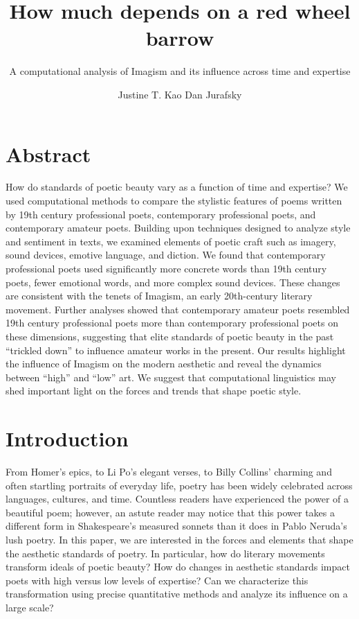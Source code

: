\documentclass{book}
\title       {How much depends on a red wheel barrow}
\subtitle    {A computational analysis of Imagism and its influence across time and expertise}
\author      {Justine T. Kao\affiliation{Department of Psychology, Stanford University} {Dan Jurafsky\affiliation{Department of Linguistics, Stanford University}}}
\begin{document}
\section*{Abstract}
How do standards of poetic beauty vary as a function of time and expertise? We used computational methods to compare the stylistic features of poems written by 19th century professional poets, contemporary professional poets, and contemporary amateur poets. Building upon techniques designed to analyze style and sentiment in texts, we examined elements of poetic craft such as imagery, sound devices, emotive language, and diction. We found that contemporary professional poets used significantly more concrete words than 19th century poets, fewer emotional words, and more complex sound devices. These changes are consistent with the tenets of Imagism, an early 20th-century literary movement. Further analyses showed that contemporary amateur poets resembled 19th century professional poets more than contemporary professional poets on these dimensions, suggesting that elite standards of poetic beauty in the past ``trickled down'' to influence amateur works in the present. Our results highlight the influence of Imagism on the modern aesthetic and reveal the dynamics between ``high'' and ``low'' art. We suggest that computational linguistics may shed important light on the forces and trends that shape poetic style.

\clearpage

\section{Introduction} 
From Homer's epics, to Li Po's elegant verses, to Billy Collins' charming and often startling portraits of everyday life, poetry has been widely celebrated across languages, cultures, and time. Countless readers have experienced the power of a beautiful poem; however, an astute reader may notice that this power takes a different form in Shakespeare's measured sonnets than it does in Pablo Neruda's lush poetry. In this paper, we are interested in the forces and elements that shape the aesthetic standards of poetry. In particular, how do literary movements transform ideals of poetic beauty? How do changes in aesthetic standards impact poets with high versus low levels of expertise? Can we characterize this transformation using precise quantitative methods and analyze its influence on a large scale? 
\end{document}
